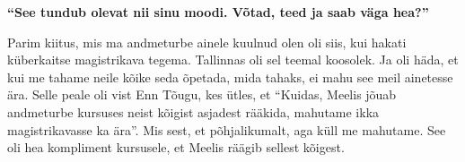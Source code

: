 \textbf{\enquote{See tundub olevat nii sinu moodi. Võtad, teed ja saab väga
hea?}}

Parim kiitus, mis ma andmeturbe ainele kuulnud olen oli siis, kui hakati
küberkaitse magistrikava tegema. Tallinnas oli sel teemal koosolek. Ja oli
häda, et kui me tahame neile kõike seda õpetada, mida tahaks, ei mahu see meil
ainetesse ära. Selle peale oli vist Enn Tõugu, kes
ütles, et \enquote{Kuidas, Meelis jõuab andmeturbe kursuses neist kõigist
asjadest rääkida, mahutame ikka magistrikavasse ka ära}. Mis sest, et
põhjalikumalt, aga küll me mahutame. See oli hea kompliment kursusele, et
Meelis räägib sellest kõigest.

